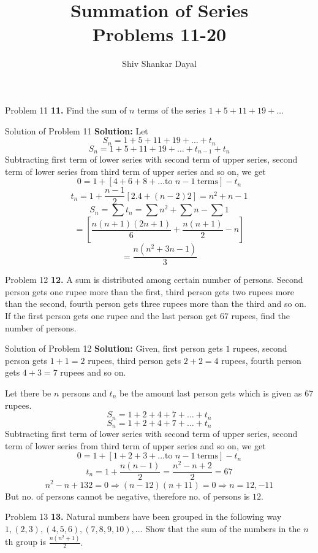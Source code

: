 \documentclass[aspectratio=1610,8pt]{beamer}
\title{Summation of Series\\Problems 11-20}
\author[Shiv Shankar Dayal]{Shiv Shankar Dayal}
\begin{document}
\begin{frame}
  \titlepage
\end{frame}
\begin{frame}{Problem 11}
  \textbf{11.} Find the sum of $n$ terms of the series $1 + 5 + 11 + 19 + \ldots$
\end{frame}
\begin{frame}{Solution of Problem 11}
  \textbf{Solution:} Let
  $$S_n = 1 + 5 + 11 + 19 + \ldots + t_n$$
  $$S_n = 1 + 5 + 11 + 19 + \ldots + t_{n -1} + t_n$$
  Subtracting first term of lower series with second term of upper series, second term of lower series from third term of upper
  series and so on, we get
  $$0 = 1 + [4 + 6 + 8 + \ldots \text{to~}n - 1~\text{terms}] - t_n$$
  $$t_n = 1 + \frac{n - 1}{2}[2.4 + (n - 2)2] = n^2 + n - 1$$
  $$S_n = \sum t_n = \sum n^2 + \sum n - \sum 1$$
  $$= \left[\frac{n(n + 1)(2n + 1)}{6} + \frac{n(n + 1)}{2} - n\right]$$
  $$= \frac{n(n^2 + 3n - 1)}{3}$$
\end{frame}
\begin{frame}{Problem 12}
  \textbf{12.} A sum is distributed among certain number of persons. Second person gets one rupee more than the first, third person
  gets two rupees more than the second, fourth person gets three rupees more than the third and so on. If the first person gets one
  rupee and the last person get $67$ rupees, find the number of persons.
\end{frame}
\begin{frame}{Solution of Problem 12}
  \textbf{Solution:} Given, first person gets $1$ rupees, second person gets $1 + 1 = 2$ rupees, third person gets $2 + 2 = 4$
  rupees, fourth person gets $4 + 3 = 7$ rupees and so on.

  Let there be $n$ persons and $t_n$ be the amount last person gets which is given as $67$ rupees.
  $$S_n = 1 + 2 + 4 + 7 + \ldots + t_n$$
  $$S_n = 1 + 2 + 4 + 7 + \ldots + t_n$$
  Subtracting first term of lower series with second term of upper series, second term of lower series from third term of upper
  series and so on, we get
  $$0 = 1 + [1 + 2 + 3 + \ldots \text{to~}n - 1~\text{terms}] - t_n$$
  $$t_n = 1 + \frac{n(n - 1)}{2} = \frac{n^2 - n + 2}{2} = 67$$
  $$n^2 - n + 132 = 0 \Rightarrow (n - 12)(n + 11) = 0\Rightarrow n = 12, -11$$
  But no. of persons cannot be negative, therefore no. of persons is $12.$
\end{frame}
\begin{frame}{Problem 13}
  \textbf{13.} Natural numbers have been grouped in the following way $1, (2, 3), (4, 5, 6), (7, 8, 9, 10), \ldots$ Show that the
  sum of the numbers in the $n$th group is $\frac{n(n^2 + 1)}{2}.$
\end{frame}
\end{document}
